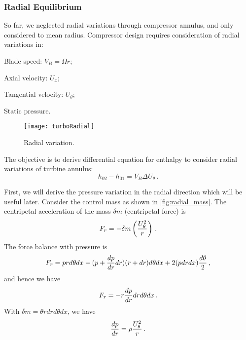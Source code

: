 \subsubsection{Radial Equilibrium}
So far, we neglected radial variations through compressor annulus, and only considered to mean radius. Compressor design requires consideration of radial variations in:
\begin{itemizePacked}
\item Blade speed: $V_B = \Omega r$;
\item Axial velocity: $U_x$;
\item Tangential velocity: $U_\theta$;
\item Static pressure.
\end{itemizePacked}

\begin{figure}[!htb!]
 \centering
    {\texttt{[image: turboRadial]}}
    \caption{\label{FIG_TURBO_RADIAL}Radial variation.}
\end{figure}

The objective is to derive differential equation for enthalpy to consider radial variations of turbine annulus:
\[
  h_{02} - h_{01} = V_B \Delta U_\theta\,.
\]

First, we will derive the pressure variation in the radial direction which will be useful later. Consider the control mass as shown in \cref{fig:radial_mass}. The centripetal acceleration of the mass $\delta m$ (centripetal force) is 
\begin{equation}
  F_r = - \delta m \left( {\frac{U_\theta^2}{r}} \right)\,.
\end{equation}
The force balance with pressure is 
\begin{equation}
  F_r = p r d\theta dx - (p + {\frac{dp}{dr}} dr) (r + dr) d\theta dx + 2(p dr dx) {\frac{d\theta}{2}}\,,
\end{equation}
and hence we have
\begin{equation}
  F_r = - r{\frac{dp}{dr}} dr  d\theta dx\,.
\end{equation}
With $\delta m = \theta r dr d\theta dx$, we have
\begin{equation}
  \label{eqn:radial_dpdr}
  {\frac{dp}{dr}} = \rho {\frac{U_\theta^2}{r}}\,.
\end{equation}

